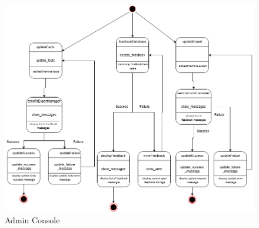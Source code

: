 \begin{figure}[H]
	\centering
	\includegraphics[width=\textwidth, height=\textheight, keepaspectratio]{Section2/images/Admin Console.png}
	\caption{Admin Console}
	\label{AdminConsole}
\end{figure}
